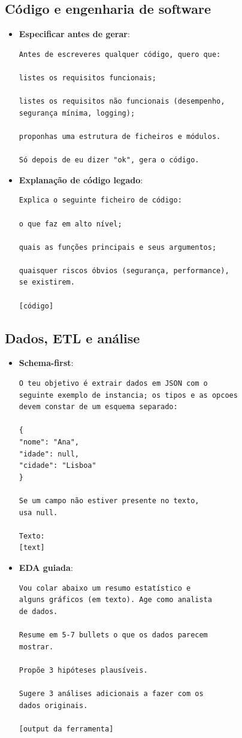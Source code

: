 \subsection*{Código e engenharia de software}

\begin{itemize}[leftmargin=*]
\item \textbf{Especificar antes de gerar}:
\begin{lstlisting}
Antes de escreveres qualquer código, quero que:

listes os requisitos funcionais;

listes os requisitos não funcionais (desempenho,
segurança mínima, logging);

proponhas uma estrutura de ficheiros e módulos.

Só depois de eu dizer "ok", gera o código.
\end{lstlisting}
\item \textbf{Explanação de código legado}:
\begin{lstlisting}
Explica o seguinte ficheiro de código:

o que faz em alto nível;

quais as funções principais e seus argumentos;

quaisquer riscos óbvios (segurança, performance),
se existirem.

[código]
\end{lstlisting}
\end{itemize}

\subsection*{Dados, ETL e análise}

\begin{itemize}[leftmargin=*]
\item \textbf{Schema-first}:
\begin{lstlisting}
O teu objetivo é extrair dados em JSON com o
seguinte exemplo de instancia; os tipos e as opcoes
devem constar de um esquema separado:

{
"nome": "Ana",
"idade": null,
"cidade": "Lisboa"
}

Se um campo não estiver presente no texto,
usa null.

Texto:
[text]
\end{lstlisting}
\item \textbf{EDA guiada}:
\begin{lstlisting}
Vou colar abaixo um resumo estatístico e
alguns gráficos (em texto). Age como analista
de dados.

Resume em 5-7 bullets o que os dados parecem
mostrar.

Propõe 3 hipóteses plausíveis.

Sugere 3 análises adicionais a fazer com os
dados originais.

[output da ferramenta]
\end{lstlisting}
\end{itemize}

